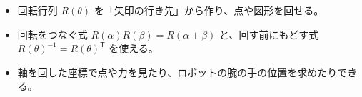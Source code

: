 \newcommand\kviigrobot{%
  \fill[bkGray!50] (-10,0) rectangle (10,3);
  \fill[bkGray!70] (-5,3) rectangle (5,9);
  \coordinate (kv1) at (0,9); \coordinate (kv2) at ($(kv1)+(62:17)$); \coordinate (kv3) at ($(kv2)+(-8:15)$);
  \draw[bkOrange!70!black, line width=4.6pt, line cap=round, line join=round] (kv1) -- (kv2) -- (kv3);
  \draw[bkOrange!35, line width=3pt, line cap=round, line join=round] (kv1) -- (kv2) -- (kv3);
  \draw[bkInk, line width=1.1pt] (kv3) -- ++(0,-3.5);
  \draw[bkInk, line width=1.1pt, line join=round] ($(kv3)+(-2.2,-6.5)$) -- ($(kv3)+(-2.2,-3.5)$) -- ($(kv3)+(2.2,-3.5)$) -- ($(kv3)+(2.2,-6.5)$);
  \filldraw[fill=white, draw=bkInk, line width=0.8pt] (kv1) circle (1.6) (kv2) circle (1.4) (kv3) circle (1.1);}
\makeatother


\begin{goal}
\begin{itemize}[label={\color{\bkTT}●}, leftmargin=1.6\zw, itemsep=0pt, topsep=1pt]
\item {}\enspace 回転行列 $R(\theta)$ を「矢印の行き先」から作り、点や図形を回せる。
\item {}\enspace 回転をつなぐ式 $R(\alpha)R(\beta)=R(\alpha+\beta)$ と、回す前にもどす式 $R(\theta)^{-1}=R(\theta)^{\mathsf T}$ を使える。
\item {}\enspace 軸を回した座標で点や力を見たり、ロボットの腕の手の位置を求めたりできる。
\end{itemize}
\end{goal}

